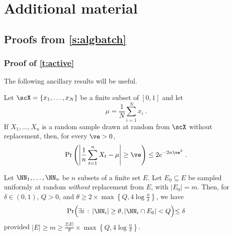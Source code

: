 \section{Additional material}
\subsection{Proofs from \autoref{s:algbatch}}

\subsubsection{Proof of \autoref{t:active}}
\label{ssec:troll_proof_bayes}

The following ancillary results will be useful.

\begin{lemma}
\label{l:hoeff-wr}
Let $\scX = \{x_1,\dots,x_N\}$ be a finite subset of $[0,1]$ and let
\[ \mu = \frac{1}{N}\sum_{i=1}^N x_i~.  \]
If $X_1,\dots,X_n$ is a random sample drawn at random from $\scX$ without replacement, then, for
every $\ve > 0$,
\[
  \Pr\left( \left|\frac{1}{n}\sum_{t=1}^n X_t - \mu \right| \ge \ve \right) \le 2e^{-2n\ve^2}~.
\]
\end{lemma}

\begin{lemma}\label{l:bins}
Let $\NN_1, \ldots, \NN_n$ be $n$ subsets of a finite set $E$.
Let $E_0 \subseteq E$ be sampled uniformly at random {\em without} replacement from $E$, with $|E_0| = m$. Then, for $\delta \in (0,1)$, $Q > 0$, and $\theta \geq 2\times\max\left\{Q,4\log \frac{n}{\delta}\right\}$, we have
\[
\Pr\Bigl( \exists i \,:\, |\NN_i| \geq \theta, |\NN_i \cap E_0| < Q\Bigl) \leq \delta
\]
provided $|E| \geq m \geq \frac{2|E|}{\theta}\times\max\left\{Q,4\log \frac{n}{\delta}\right\}$.
\end{lemma}

